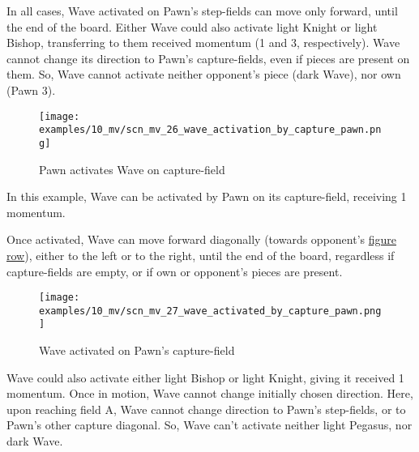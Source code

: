 In all cases, Wave activated on Pawn's step-fields can move only forward, until the end
of the board. Either Wave could also activate light Knight or light Bishop, transferring
to them received momentum (1 and 3, respectively). Wave cannot change its direction to
Pawn's capture-fields, even if pieces are present on them. So, Wave cannot activate neither
opponent's piece (dark Wave), nor own (Pawn 3).

\clearpage %

\noindent
\begin{figure}[!h]
\texttt{[image: examples/10\_mv/scn\_mv\_26\_wave\_activation\_by\_capture\_pawn.png]}
\caption{Pawn activates Wave on capture-field}
\label{fig:scn_mv_26_wave_activation_by_capture_pawn}
\end{figure}

In this example, Wave can be activated by Pawn on its capture-field, receiving 1 momentum.

Once activated, Wave can move forward diagonally (towards opponent's
\hyperref[sec:Terms/Figure row]{figure row}), either to the left or to the right, until the
end of the board, regardless if capture-fields are empty, or if own or opponent's pieces are
present.

\clearpage %

\noindent
\begin{figure}[!h]
\texttt{[image: examples/10\_mv/scn\_mv\_27\_wave\_activated\_by\_capture\_pawn.png]}
\caption{Wave activated on Pawn's capture-field}
\label{fig:scn_mv_27_wave_activated_by_capture_pawn}
\end{figure}

Wave could also activate either light Bishop or light Knight, giving it received 1 momentum.
Once in motion, Wave cannot change initially chosen direction. Here, upon reaching field A,
Wave cannot change direction to Pawn's step-fields, or to Pawn's other capture diagonal. So,
Wave can't activate neither light Pegasus, nor dark Wave.

\clearpage %


